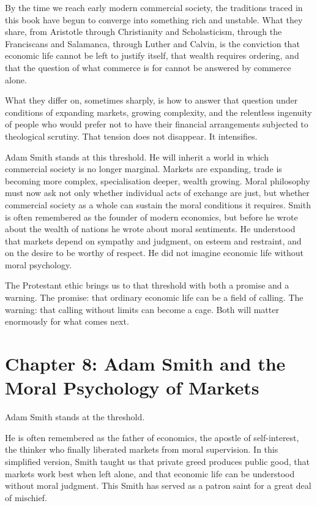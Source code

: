 \documentclass[11pt,a4paper,oneside]{book}
\begin{document}
By the time we reach early modern commercial society, the traditions traced in this book have begun to converge into something rich and unstable. What they share, from Aristotle through Christianity and Scholasticism, through the Franciscans and Salamanca, through Luther and Calvin, is the conviction that economic life cannot be left to justify itself, that wealth requires ordering, and that the question of what commerce is for cannot be answered by commerce alone.

What they differ on, sometimes sharply, is how to answer that question under conditions of expanding markets, growing complexity, and the relentless ingenuity of people who would prefer not to have their financial arrangements subjected to theological scrutiny. That tension does not disappear. It intensifies.

Adam Smith stands at this threshold. He will inherit a world in which commercial society is no longer marginal. Markets are expanding, trade is becoming more complex, specialisation deeper, wealth growing. Moral philosophy must now ask not only whether individual acts of exchange are just, but whether commercial society as a whole can sustain the moral conditions it requires. Smith is often remembered as the founder of modern economics, but before he wrote about the wealth of nations he wrote about moral sentiments. He understood that markets depend on sympathy and judgment, on esteem and restraint, and on the desire to be worthy of respect. He did not imagine economic life without moral psychology.

The Protestant ethic brings us to that threshold with both a promise and a warning. The promise: that ordinary economic life can be a field of calling. The warning: that calling without limits can become a cage. Both will matter enormously for what comes next.

\chapter*{Chapter 8: Adam Smith and the Moral Psychology of Markets}

Adam Smith stands at the threshold.

He is often remembered as the father of economics, the apostle of self-interest, the thinker who finally liberated markets from moral supervision. In this simplified version, Smith taught us that private greed produces public good, that markets work best when left alone, and that economic life can be understood without moral judgment. This Smith has served as a patron saint for a great deal of mischief.
\end{document}
